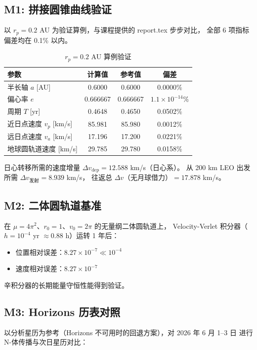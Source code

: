 \documentclass[12pt,a4paper]{ctexart}
\begin{document}
\subsection{M1: 拼接圆锥曲线验证}

以 $r_p = 0.2$ AU 为验证算例，与课程提供的 report.tex 步步对比，
全部 6 项指标偏差均在 0.1\% 以内。

\begin{table}[H]
\centering
\caption{$r_p = 0.2$ AU 算例验证}
\begin{tabular}{lccc}
\toprule
参数 & 计算值 & 参考值 & 偏差 \\
\midrule
半长轴 $a$ [AU] & 0.6000 & 0.6000 & 0.0000\% \\
偏心率 $e$ & 0.666667 & 0.666667 & $1.1\times10^{-14}$\% \\
周期 $T$ [yr] & 0.4648 & 0.4650 & 0.0502\% \\
近日点速度 $v_p$ [km/s] & 85.981 & 85.980 & 0.0012\% \\
远日点速度 $v_a$ [km/s] & 17.196 & 17.200 & 0.0221\% \\
地球圆轨道速度 [km/s] & 29.785 & 29.780 & 0.0158\% \\
\bottomrule
\end{tabular}
\end{table}

日心转移所需的速度增量 $\Delta v_{\text{dep}} = 12.588$ km/s（日心系）。
从 200 km LEO 出发所需 $\Delta v_{\text{发射}} = 8.939$ km/s，
往返总 $\Delta v$（无月球借力）$= 17.878$ km/s。

\subsection{M2: 二体圆轨道基准}

在 $\mu = 4\pi^2$、$r_0 = 1$、$v_0 = 2\pi$ 的无量纲二体圆轨道上，
Velocity-Verlet 积分器（$h = 10^{-4}$ yr $\approx 0.88$ h）运转 1 年后：
\begin{itemize}
\item 位置相对误差：$8.27 \times 10^{-7} \ll 10^{-4}$ \checkmark
\item 速度相对误差：$8.27 \times 10^{-7}$
\end{itemize}
辛积分器的长期能量守恒性能得到验证。

\subsection{M3: Horizons 历表对照}

以分析星历为参考（Horizons 不可用时的回退方案），对 2026 年 6 月 1--3 日
进行 N-体传播与次日星历对比：
\end{document}
